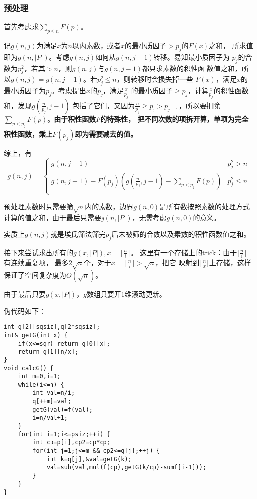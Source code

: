 \subsubsection{预处理}
首先考虑求$\displaystyle \sum_{p\leq n}{F(p)}$。

记$g(n,j)$为满足$x$为$n$以内素数，或者$x$的最小质因子$>p_j$的$F(x)$之和，
所求值即为$g(n,|P|)$。考虑$g(n,j)$如何从$g(n,j-1)$转移。易知最小质因子为
$p_j$的合数为$p_j^2$，若其$>n$，则$g(n,j)$与$g(n,j-1)$都只求素数的积性函
数值之和，所以$g(n,j)=g(n,j-1)$。若$p_j^2\leq n$，则转移时会损失掉一些
$F(x)$，满足$x$的最小质因子为$p_j$。考虑提出$x$的$p_j$，满足$\frac{x}{p_j}$
的最小质因子$\geq p_j$，计算$\frac{x}{p_j}$的积性函数和，发现$g(\frac{n}{p_j},j-1)$
包括了它们，又因为$\frac{n}{p_j}\geq p_j > p_{j-1}$，所以要扣除
$\displaystyle \sum_{p<p_j}F(p)$。{\bfseries 由于积性函数$F$的特殊性，
把不同次数的项拆开算，单项为完全积性函数，乘上$F(p_j)$即为需要减去的值。}

综上，有\begin{displaymath}
    g(n,j)=\left\{\begin{array}{lr}
        g(n,j-1)        & p_j^2>n   \\
        g(n,j-1)-F(p_j)(g(\frac{n}{p_j},j-1)-\displaystyle \sum_{p<p_j}{F(p)}) & p_j^2\leq n \\
    \end{array}\right.
\end{displaymath}

预处理素数时只需要筛$\sqrt{n}$内的素数，边界$g(n,0)$是所有数按照素数的处理方式
计算的值之和，由于最后只需要$g(n,|P|)$，无需考虑$g(n,0)$的意义。

实质上$g(n,j)$就是埃氏筛法筛完$p_j$后未被筛的合数以及素数的积性函数值之和。

接下来尝试求出所有的$g(x,|P|),x=\lfloor \frac{n}{i}\rfloor$。
这里有一个存储上的trick：由于$\lfloor \frac{n}{i}\rfloor$有连续重复项，
最多$2\sqrt{n}$个，对于$x=\lfloor \frac{n}{i}\rfloor>\sqrt{n}$，把它
映射到$\lfloor \frac{n}{x}\rfloor$上存储，这样保证了空间复杂度为$O(\sqrt{n})$。

由于最后只要$g(x,|P|)$，$g$数组只要开1维滚动更新。

伪代码如下：
\begin{lstlisting}
int g[2][sqsiz],q[2*sqsiz];
int& getG(int x) {
    if(x<=sqr) return g[0][x];
    return g[1][n/x];
}
void calcG() {
    int m=0,i=1;
    while(i<=n) {
        int val=n/i;
        q[++m]=val;
        getG(val)=f(val);
        i=n/val+1;
    }
    for(int i=1;i<=psiz;++i) {
        int cp=p[i],cp2=cp*cp;
        for(int j=1;j<=m && cp2<=q[j];++j) {
            int k=q[j],&val=getG(k);
            val=sub(val,mul(f(cp),getG(k/cp)-sumf[i-1]));
        }
    }
}
\end{lstlisting}
